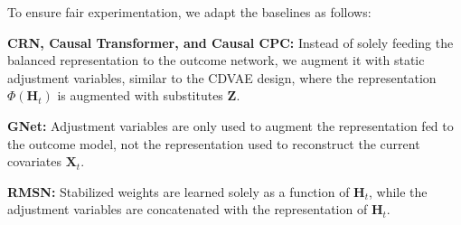 \documentclass[10pt]{article} %
\begin{document}
\noindent
\begin{minipage}[t]{0.5\textwidth}
\vspace{-70pt} %
    To ensure fair experimentation, we adapt the baselines as follows:\\
    \begin{inparaenum}
        \item \textbf{CRN, Causal Transformer, and Causal CPC:} Instead of solely feeding the balanced representation to the outcome network, we augment it with static adjustment variables, similar to the CDVAE design, where the representation \(\Phi(\mathbf{H}_t)\) is augmented with substitutes \(\mathbf{Z}\).\\
        \item \textbf{GNet:} Adjustment variables are only used to augment the representation fed to the outcome model, not the representation used to reconstruct the current covariates \(\mathbf{X}_t\).\\
        \item \textbf{RMSN:} Stabilized weights are learned solely as a function of \(\mathbf{H}_t\), while the adjustment variables are concatenated with the representation of \(\mathbf{H}_t\).
    \end{inparaenum}
\end{minipage}%
\hfill
\begin{minipage}[t]{0.45\textwidth}
    \centering
    \label{tab:models_complexities}
\end{minipage}
\end{document}
